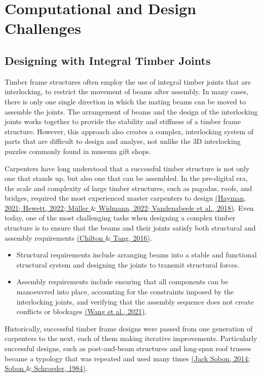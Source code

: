 \documentclass[11pt]{book}
\begin{document}
\section{Computational and Design Challenges}

\subsection{Designing with Integral Timber Joints}

Timber frame structures often employ the use of integral timber joints that are interlocking, to restrict the movement of beams after assembly. In many cases, there is only one single direction in which the mating beams can be moved to assemble the joints. The arrangement of beams and the design of the interlocking joints works together to provide the stability and stiffness of a timber frame structure. However, this approach also creates a complex, interlocking system of parts that are difficult to design and analyse, not unlike the 3D interlocking puzzles commonly found in museum gift shops.

Carpenters have long understood that a successful timber structure is not only one that stands up, but also one that can be assembled. In the pre-digital era, the scale and complexity of large timber structures, such as pagodas, roofs, and bridges, required the most experienced master carpenters to design \href{https://www.zotero.org/google-docs/?FJwvT8}{(Hayman, 2021; Hewett, 2022; Müller $\&$ Widmann, 2022; Vandenabeele et al., 2018)}. Even today, one of the most challenging tasks when designing a complex timber structure is to ensure that the beams and their joints satisfy both structural and assembly requirements \href{https://www.zotero.org/google-docs/?cy6tn2}{(Chilton $\&$ Tang, 2016)}. 

\begin{itemize}
	\item Structural requirements include arranging beams into a stable and functional structural system and designing the joints to transmit structural forces. 

	\item Assembly requirements include ensuring that all components can be manoeuvred into place, accounting for the constraints imposed by the interlocking joints, and verifying that the assembly sequence does not create conflicts or blockages \href{https://www.zotero.org/google-docs/?81R5f7}{(Wang et al., 2021)}. 

\end{itemize}
Historically, successful timber frame designs were passed from one generation of carpenters to the next, each of them making iterative improvements. Particularly successful designs, such as post-and-beam structures and long-span roof trusses became a typology that was repeated and used many times \href{https://www.zotero.org/google-docs/?u1rNPf}{(Jack Sobon, 2014; Sobon $\&$ Schroeder, 1984)}.
\end{document}
